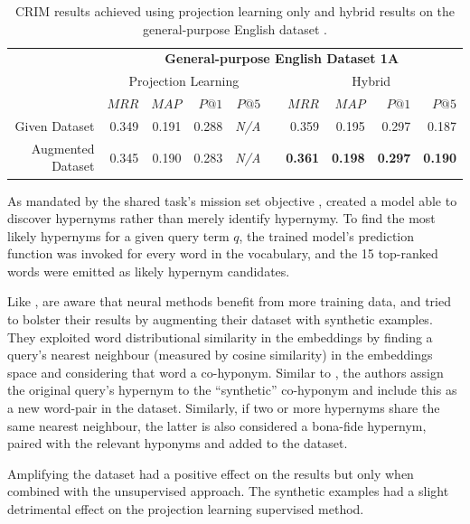 \begin{table}\centering
    \begin{tabular}{@{}rrrrrcrrrr@{}} \toprule
    & \multicolumn{9}{c}{\textbf{General-purpose English Dataset 1A}} \\ \cmidrule{2-10} 
    & \multicolumn{4}{c}{Projection Learning} & \phantom{a} & \multicolumn{4}{c}{Hybrid} \\
    \cmidrule{2-5} \cmidrule{7-10}
    & $MRR$ & $MAP$ & $P@1$ & $P@5$ && $MRR$ & $MAP$ & $P@1$ & $P@5$ \\ \midrule
    Given Dataset & 0.349 & 0.191 & 0.288 & \textit{N/A} && 0.359 & 0.195 & 0.297 & 0.187 \\
    Augmented Dataset & 0.345 & 0.190 & 0.283 & \textit{N/A} && \textbf{0.361} & \textbf{0.198} & \textbf{0.297} & \textbf{0.190} \\
    \bottomrule
    \end{tabular}
    \caption{\ac{CRIM} results achieved using projection learning only and hybrid results on the general-purpose English dataset \citep{bernier2018crim}.}\label{tab:CRIM_results}
\end{table}

As mandated by the shared task's mission set objective \citep{camacho2018semeval}, \citep{bernier2018crim} created a model able to discover hypernyms rather than merely identify hypernymy.  To find the most likely hypernyms for a given query term $q$, the trained model's prediction function was invoked for every word in the vocabulary, and the 15 top-ranked words were emitted as likely hypernym candidates.

Like \citep{espinosa2016supervised}, \citeauthor{bernier2018crim} are aware that neural methods benefit from more training data, and tried to bolster their results by augmenting their dataset with synthetic examples.  They exploited word distributional similarity in the embeddings by finding a query’s nearest neighbour (measured by cosine similarity) in the embeddings space and considering that word a co-hyponym.  Similar to \citep{Snow2004, ritter2009anyway}, the authors assign the original query’s hypernym to the “synthetic” co-hyponym and include this as a new word-pair in the dataset.  Similarly, if two or more hypernyms share the same nearest neighbour, the latter is also considered a bona-fide hypernym, paired with the relevant hyponyms and added to the dataset.  

Amplifying the dataset had a positive effect on the results but only when combined with the unsupervised approach.  The synthetic examples had a slight detrimental effect on the projection learning supervised method.

